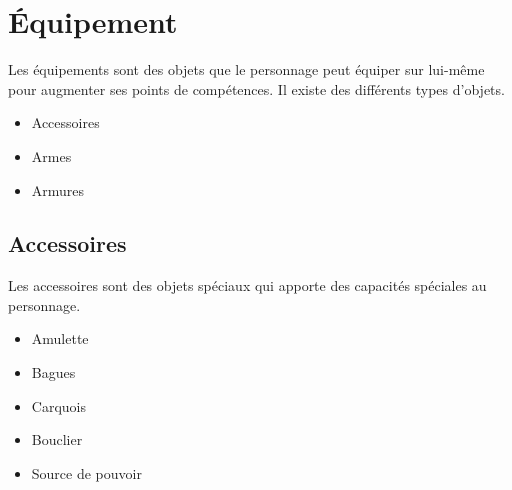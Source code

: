 \documentclass[11pt, a4paper, oneside]{report}
\begin{document}
\section{Équipement}
Les équipements sont des objets que le personnage peut équiper sur lui-même pour augmenter ses points de compétences. Il existe des différents types d'objets.
\begin{itemize}
	\item Accessoires
	\item Armes
	\item Armures
\end{itemize}
\subsection{Accessoires}
\label{subsec:accessoires}
Les accessoires sont des objets spéciaux qui apporte des capacités spéciales au personnage.
\begin{multicols}{2}
\begin{itemize}
    \item Amulette
    \item Bagues
    \item Carquois
    \item Bouclier
    \item Source de pouvoir
\end{itemize}
\end{multicols}
\end{document}
